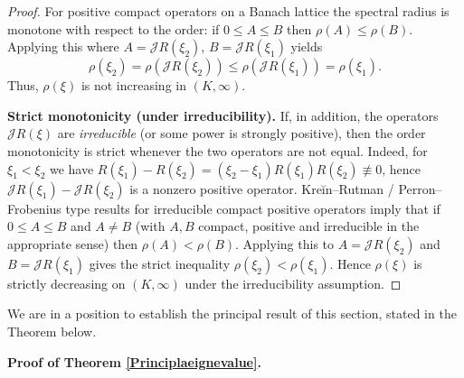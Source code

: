 \documentclass[a4paper,11pt]{amsart}
\theoremstyle{definition}
\numberwithin{equation}{section}
\theoremstyle{definition}
\begin{document}
\begin{proof}
For positive compact operators on a Banach lattice the spectral radius is monotone with respect to the order:
if \(0\leq A\leq B\) then \(\rho(A)\leq\rho(B)\). Applying this where
\(A=\mathscr J R(\xi_2)\), \(B=\mathscr J R(\xi_1)\) yields
\[
\rho(\xi_2)=\rho(\mathscr J R(\xi_2)) \leq \rho(\mathscr J R(\xi_1))=\rho(\xi_1).
\]
Thus, \(\rho(\xi)\) is not increasing in \((K,\infty)\).

\medskip
\noindent\textbf{Strict monotonicity (under irreducibility).}
If, in addition, the operators \(\mathscr J R(\xi)\) are \emph{irreducible} (or some power is strongly positive),
then the order monotonicity is strict whenever the two operators are not equal. Indeed, for
\(\xi_1<\xi_2\) we have \(R(\xi_1)-R(\xi_2)=(\xi_2-\xi_1)R(\xi_1)R(\xi_2)\not\equiv 0\), hence
\(\mathscr J R(\xi_1)-\mathscr J R(\xi_2)\) is a nonzero positive operator. Kreĭn--Rutman / Perron--Frobenius
type results for irreducible compact positive operators imply that if \(0\leq A\leq B\) and \(A\neq B\)
(with \(A,B\) compact, positive and irreducible in the appropriate sense) then \(\rho(A)<\rho(B)\).
Applying this to \(A=\mathscr J R(\xi_2)\) and \(B=\mathscr J R(\xi_1)\) gives the strict inequality
\(\rho(\xi_2)<\rho(\xi_1)\). Hence \(\rho(\xi)\) is strictly decreasing on \((K,\infty)\) under the irreducibility assumption.
\end{proof}

We are in a position to establish the principal result of this section, stated in the Theorem below.

\textbf{Proof of Theorem \eqref{Principlaeignevalue}.}
\end{document}
